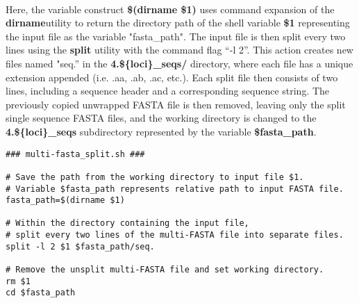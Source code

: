 \paragraph{} Here, the variable construct \textbf{\$(dirname \$1)} uses command expansion of the \textbf{dirname}utility to return the directory path of the shell variable \textbf{\$1} representing the input file as the variable "fasta\_path".  The input file is then split every two lines using the \textbf{split} utility with the command flag “-l 2”.  This action creates new files named "seq.” in the \textbf{4.\$\{loci\}\_seqs/} directory, where each file has a unique extension appended (i.e. .aa, .ab, .ac, etc.).  Each split file then consists of two lines, including a sequence header and a corresponding sequence string.  The previously copied unwrapped FASTA file is then removed, leaving only the split single sequence FASTA files, and the working directory is changed to the \textbf{4.\$\{loci\}\_seqs} subdirectory represented by the variable \textbf{\$fasta\_path}.

\vspace*{30pt}

\begin{lstlisting}[caption={Contents of the \textit{multi-fasta\_split.sh} script}]
### multi-fasta_split.sh ###

# Save the path from the working directory to input file $1.
# Variable $fasta_path represents relative path to input FASTA file.
fasta_path=$(dirname $1)

# Within the directory containing the input file,
# split every two lines of the multi-FASTA file into separate files.
split -l 2 $1 $fasta_path/seq.

# Remove the unsplit multi-FASTA file and set working directory.
rm $1
cd $fasta_path
\end{lstlisting}

\vspace*{30pt}

